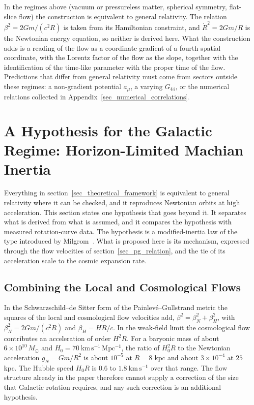 \documentclass[pdflatex,sn-mathphys-num]{sn-jnl}%
\theoremstyle{thmstyleone}%
\theoremstyle{thmstyletwo}%
\theoremstyle{thmstylethree}%
\begin{document}
In the regimes above (vacuum or pressureless matter, spherical symmetry, flat-slice flow) the construction is equivalent to general relativity. The relation $\beta^2=2Gm/(c^2R)$ is taken from its Hamiltonian constraint, and $\dot{R}^2=2Gm/R$ is the Newtonian energy equation, so neither is derived here. What the construction adds is a reading of the flow as a coordinate gradient of a fourth spatial coordinate, with the Lorentz factor of the flow as the slope, together with the identification of the time-like parameter with the proper time of the flow. Predictions that differ from general relativity must come from sectors outside these regimes: a non-gradient potential $a_\mu$, a varying $G_{44}$, or the numerical relations collected in Appendix~\ref{sec_numerical_correlations}.




\section{A Hypothesis for the Galactic Regime: Horizon-Limited Machian Inertia}\label{sec_machian_hypothesis}

Everything in section~\ref{sec_theoretical_framework} is equivalent to general relativity where it can be checked, and it reproduces Newtonian orbits at high acceleration. This section states one hypothesis that goes beyond it. It separates what is derived from what is assumed, and it compares the hypothesis with measured rotation-curve data. The hypothesis is a modified-inertia law of the type introduced by Milgrom~\cite{Milgrom1983}. What is proposed here is its mechanism, expressed through the flow velocities of section~\ref{sec_pg_relation}, and the tie of its acceleration scale to the cosmic expansion rate.


\subsection{Combining the Local and Cosmological Flows}

In the Schwarzschild--de Sitter form of the Painlev\'e--Gullstrand metric the squares of the local and cosmological flow velocities add, $\beta^{2}=\beta_N^{2}+\beta_H^{2}$, with $\beta_N^{2}=2Gm/(c^{2}R)$ and $\beta_H=HR/c$. In the weak-field limit the cosmological flow contributes an acceleration of order $H^{2}R$. For a baryonic mass of about $6\times10^{10}\,M_\odot$ and $H_0=70~\mathrm{km\,s^{-1}\,Mpc^{-1}}$, the ratio of $H_0^{2}R$ to the Newtonian acceleration $g_N=Gm/R^{2}$ is about $10^{-5}$ at $R=8$ kpc and about $3\times10^{-4}$ at $25$ kpc. The Hubble speed $H_0R$ is $0.6$ to $1.8~\mathrm{km\,s^{-1}}$ over that range. The flow structure already in the paper therefore cannot supply a correction of the size that Galactic rotation requires, and any such correction is an additional hypothesis.
\end{document}
